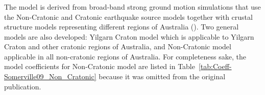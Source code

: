 \subsubsection{\citet{eqrm_Somerville09}}

The \citet{eqrm_Somerville09} model is derived from broad-band
strong ground motion simulations that use the Non-Cratonic and
Cratonic earthquake source models together with crustal structure
models representing different regions of Australia (\citet[Table
7-1]{eqrm_Somerville09}). Two general models are also developed:
Yilgarn Craton model which is applicable to Yilgarn Craton and other
cratonic regions of Australia, and Non-Cratonic model applicable in
all non-cratonic regions of Australia. For completeness sake, the
model coefficients for Non-Cratonic model are listed in
Table~\ref{tab:Coeff-Somerville09_Non_Cratonic} because it was
omitted from the original publication.

